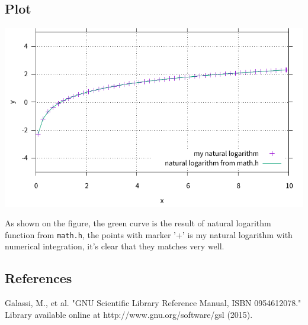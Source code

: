 \documentclass[oneside, 12pt, a4paper]{article}
\begin{document}
\subsection*{Plot}

\begin{center}
    \includegraphics[width=1\textwidth]{plot.pdf}
\end{center}
%
As shown on the figure, the green curve is the result of natural logarithm function from \texttt{math.h}, the points with marker '+' is my natural logarithm with numerical integration, it's clear that they matches very well.  

\subsection*{References}
%
Galassi, M., et al. "GNU Scientific Library Reference Manual, ISBN 0954612078." Library available online at http://www.gnu.org/software/gsl (2015).

\end{document}
